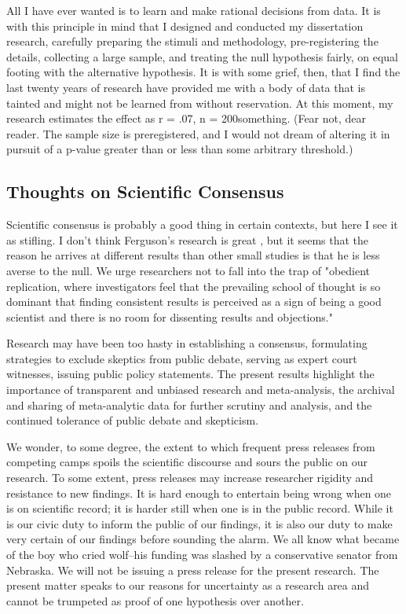 \documentclass[man]{apa6}
\begin{document}
All I have ever wanted is to learn and make rational decisions from data. It is with this principle in mind that I designed and conducted my dissertation research, carefully preparing the stimuli and methodology, pre-registering the details, collecting a large sample, and treating the null hypothesis fairly, on equal footing with the alternative hypothesis. It is with some grief, then, that I find the last twenty years of research have provided me with a body of data that is tainted and might not be learned from without reservation. At this moment, my research estimates the effect as r = .07, n = 200something. (Fear not, dear reader. The sample size is preregistered, and I would not dream of altering it in pursuit of a p-value greater than or less than some arbitrary threshold.)

\subsection{Thoughts on Scientific Consensus}
Scientific consensus is probably a good thing in certain contexts, but here I see it as stifling. I don't think Ferguson's research is great \citet[and we have even criticized his research as using too small of samples, see ][]{Hilgard:etal:2015}, but it seems that the reason he arrives at different results than other small studies is that he is less averse to the null. We urge researchers not to fall into the trap of "obedient replication, where investigators feel that the prevailing school of thought is so dominant that finding consistent results is perceived as a sign of being a good scientist and there is no room for dissenting results and objections." \citep{Ioannidis:2012} %

Research may have been too hasty in establishing a consensus, formulating strategies to exclude skeptics from public debate, serving as expert court witnesses, issuing public policy statements. The present results highlight the importance of transparent and unbiased research and meta-analysis, the archival and sharing of meta-analytic data for further scrutiny and analysis, and the continued tolerance of public debate and skepticism.

We wonder, to some degree, the extent to which frequent press releases from competing camps spoils the scientific discourse and sours the public on our research. 
To some extent, press releases may increase researcher rigidity and resistance to new findings. It is hard enough to entertain being wrong when one is on scientific record; it is harder still when one is in the public record.
While it is our civic duty to inform the public of our findings, it is also our duty to make very certain of our findings before sounding the alarm. We all know what became of the boy who cried wolf--his funding was slashed by a conservative senator from Nebraska. 
We will not be issuing a press release for the present research. The present matter speaks to our reasons for uncertainty as a research area and cannot be trumpeted as proof of one hypothesis over another. 
\end{document}
